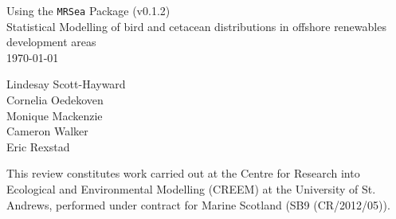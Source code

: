 
\begin{titlepage}


\begin{center}
\vspace* {0.70 in}

\noindent\makebox[\linewidth]{\rule{\paperwidth}{0.4pt}}

\huge{Using the {\tt MRSea} Package (v0.1.2)}\\[0.5 cm]
\Large{Statistical Modelling of bird and cetacean distributions in offshore renewables development areas}\\
\vspace{0.3 in}
\today

\noindent\makebox[\linewidth]{\rule{\paperwidth}{0.4pt}}


\vspace{1 in}
\Large{Lindesay Scott-Hayward}\\
\Large{Cornelia Oedekoven}\\
\Large{Monique Mackenzie}\\
\Large{Cameron Walker}\\
\Large{Eric Rexstad}\\[0.5 cm]


\vspace{1.6 in}
\begin{center}
\large{This review constitutes work carried out at the Centre for Research into Ecological and Environmental Modelling (CREEM) at the University of St. Andrews, performed under contract for Marine Scotland (SB9 (CR/2012/05)).}
\end{center}


\thispagestyle{empty}

\end{center}

\end{titlepage}
